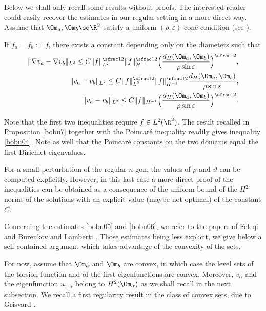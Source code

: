 Below we shall only recall some results without proofs. The interested reader could easily recover the estimates in our regular setting in a more direct way.
Assume that $\Om_a, \Om_b\sq \R^2$ satisfy a uniform $(\rho, \varepsilon)$-cone condition (see \cite[Def.\,2.6]{SaSc02}).
\begin{propo}\label{bobu7} If $f_a=f_b:=f$, there exists a constant depending only on the diameters such that
\begin{align}\label{bobu03}
\|\nabla v_a- \nabla v_b\|_{L^2} \le C\|f\|_{L^2}^{\sfrac 12} \|f\|_{H^{-1} }^{\sfrac 12} \Big (\frac{d_H(\Om_a, \Om_b)}{\rho \sin \varepsilon}\Big)^{\sfrac 12},
\\
\label{bobu08}
\|v_a- v_b\|_{L^2} \le C\|f\|_{L^2}^{\sfrac 12} \|f\|_{H^{-1} }^{\sfrac 12} \frac{d_H(\Om_a, \Om_b)}{\rho \sin \varepsilon},
\\
\label{bobu30}
\|v_a- v_b\|_{L^2} \le C \|f\|_{H^{-1} } \Big (\frac{d_H(\Om_a, \Om_b)}{\rho \sin \varepsilon}\Big)^{\sfrac 12}.
\end{align}

\end{propo}
Note that the first two inequalities require $f\in L^2(\R^2)$. The result recalled in Proposition \ref{bobu7} together with the Poincaré inequality readily gives inequality \eqref{bobu04}. Note as well that the Poincaré constants on the two domains equal the first Dirichlet eigenvalues.

For a small perturbation of the regular $n$-gon, the values of $\rho$ and $\vartheta $ can be computed explicitly.
However, in this last case a more direct proof of the inequalities can be obtained as a consequence of the uniform bound of the $H^2$ norms of the solutions with an explicit value (maybe not optimal) of the constant $C$.

Concerning the estimates \eqref{bobu05} and \eqref{bobu06}, we refer to the papers of Feleqi \cite{FE16} and Burenkov and Lamberti \cite{BuLa12}. Those estimates being less explicit, we give below a self contained argument which takes advantage of the convexity of the sets.

For now, assume that $\Om_a$ and $\Om_b$ are convex, in which case the level sets of the torsion function and of the first eigenfunctions are convex. Moreover, $v_\alpha$ and the eigenfunction $u_{1,\alpha}$ belong to $H^2(\Om_\alpha)$ as we shall recall in the next subsection. We recall a first regularity result in the class of convex sets, due to Grisvard \cite[Th.\,3.1.2.1]{grisvard}.

